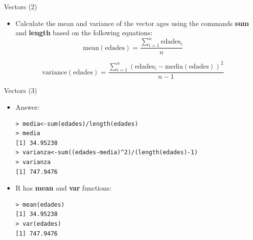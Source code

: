 \documentclass[handout]{beamer}
\begin{document}
\begin{frame}[fragile]{Vectors (2)}
\scriptsize{
\begin{itemize}
 \item Calculate the mean and variance of the vector ages using the commands \textbf{sum} and \textbf{length} based on the following equations:
 \begin{equation}
  \text{mean}(\text{edades})=\frac{\sum_{i=1}^n\text{edades}_{i}}{n}
 \end{equation}
 
 \begin{equation}
 \text{variance}(\text{edades})=\frac{\sum_{i=1}^n(\text{edades}_{i}-\text{media}(\text{edades}))^2 }{n-1} 
 \end{equation}

 
\end{itemize}



}

 
\end{frame}



\begin{frame}[fragile]{Vectors (3)}
\scriptsize{
\begin{itemize}
 \item Answer:
 \begin{verbatim}
> media<-sum(edades)/length(edades)
> media
[1] 34.95238
> varianza<-sum((edades-media)^2)/(length(edades)-1)
> varianza
[1] 747.9476
 \end{verbatim}
 
 \item R has \textbf{mean} and \textbf{var} functions:
 \begin{verbatim}
> mean(edades)
[1] 34.95238
> var(edades)
[1] 747.9476

 \end{verbatim}
 
\end{itemize}



}

 
\end{frame}
 
\end{document}
